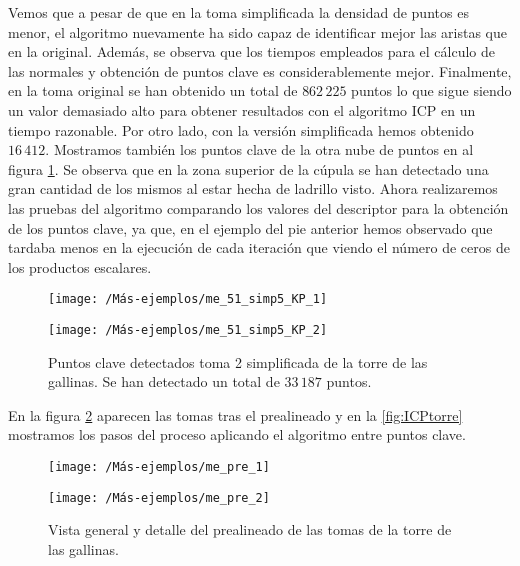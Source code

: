 Vemos que a pesar de que en la toma simplificada la densidad de puntos es menor, el algoritmo nuevamente ha sido capaz de identificar mejor las aristas que en la original. Además, se observa que los tiempos empleados para el cálculo de las normales y obtención de puntos clave es considerablemente mejor. Finalmente, en la toma original se han obtenido un total de $ 862\,225 $ puntos lo que sigue siendo un valor demasiado alto para obtener resultados con el algoritmo ICP en un tiempo razonable. Por otro lado, con la versión simplificada hemos obtenido $16\,412 $. Mostramos también los puntos clave de la otra nube de puntos en al figura \ref{me_51_KP_simp4}. Se observa que en la zona superior de la cúpula se han detectado una gran cantidad de los mismos al estar hecha de ladrillo visto. Ahora realizaremos las pruebas del algoritmo comparando los valores del descriptor para la obtención de los puntos clave, ya que, en el ejemplo del pie anterior hemos observado que tardaba menos en la ejecución de cada iteración que viendo el número de ceros de los productos escalares.

\begin{figure}[h!]	
	\begin{minipage}[b]{0.5\textwidth}
		\centering		
		\texttt{[image: /Más-ejemplos/me\_51\_simp5\_KP\_1]} 
	\end{minipage}
	\begin{minipage}[b]{0.5\textwidth}
		\texttt{[image: /Más-ejemplos/me\_51\_simp5\_KP\_2]}
	\end{minipage}
	\caption{Puntos clave detectados toma 2 simplificada de la torre de las gallinas. Se han detectado un total de $ 33\,187 $ puntos.}
	\label{me_51_KP_simp4}
\end{figure}

En la figura \ref{fig:ICPtorrePre} aparecen las tomas tras el prealineado y en la \ref{fig:ICPtorre} mostramos los pasos del proceso aplicando el algoritmo entre puntos clave. \\

\begin{figure}[h!]	
	\begin{minipage}[b]{0.5\textwidth}
		\centering		
		\texttt{[image: /Más-ejemplos/me\_pre\_1]} 
	\end{minipage}
	\begin{minipage}[b]{0.5\textwidth}
		\centering
		\texttt{[image: /Más-ejemplos/me\_pre\_2]}
	\end{minipage}
	\caption{Vista general y detalle del prealineado de las tomas de la torre de las gallinas.}
	\label{fig:ICPtorrePre}
\end{figure}


